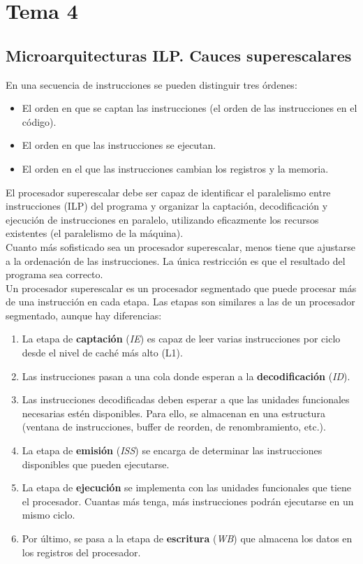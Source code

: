 \documentclass[12pt,spanish]{article}
\begin{document}
\newpage

\section{Tema 4}

\subsection{Microarquitecturas ILP. Cauces superescalares}


En una secuencia de instrucciones se pueden distinguir tres órdenes:

\begin{itemize}
	\item El orden en que se captan las instrucciones (el orden de las instrucciones en el código).
	\item El orden en que las instrucciones se ejecutan.
	\item El orden en el que las instrucciones cambian los registros y la memoria.
\end{itemize}

El procesador superescalar debe ser capaz de identificar el paralelismo entre instrucciones (ILP) del programa y organizar la captación, decodificación y ejecución de instrucciones en paralelo, utilizando eficazmente los recursos existentes (el paralelismo de la máquina).\\

Cuanto más sofisticado sea un procesador superescalar, menos tiene que ajustarse a la ordenación de las instrucciones. La única restricción es que el resultado del programa sea correcto.\\

Un procesador superescalar es un procesador segmentado que puede procesar más de una instrucción en cada etapa. Las etapas son similares a las de un procesador segmentado, aunque hay diferencias:

\begin{enumerate}
	\item La etapa de \textbf{captación} (\textit{IE}) es capaz de leer varias instrucciones por ciclo desde el nivel de caché más alto (L1).
	\item Las instrucciones pasan a una cola donde esperan a la \textbf{decodificación} (\textit{ID}).
	\item Las instrucciones decodificadas deben esperar a que las unidades funcionales necesarias estén disponibles. Para ello, se almacenan en una estructura (ventana de instrucciones, buffer de reorden, de renombramiento, etc.).
	\item La etapa de \textbf{emisión} (\textit{ISS}) se encarga de determinar las instrucciones disponibles que pueden ejecutarse.
	\item La etapa  de \textbf{ejecución} se implementa con las unidades funcionales que tiene el procesador. Cuantas más tenga, más instrucciones podrán ejecutarse en un mismo ciclo.
	\item Por último, se pasa a la etapa de \textbf{escritura} (\textit{WB}) que almacena los datos en los registros del procesador.
\end{enumerate}
\end{document}
